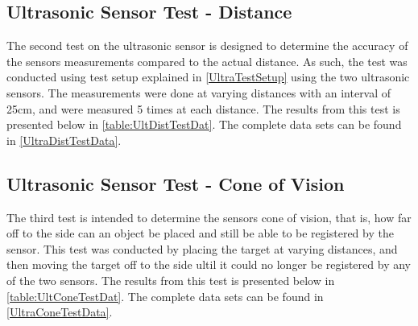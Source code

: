 \subsection{Ultrasonic Sensor Test - Distance}
The second test on the ultrasonic sensor is designed to determine the accuracy
of the sensors measurements compared to the actual distance. As such, the test
was conducted using test setup explained in \autoref{UltraTestSetup} using the
two ultrasonic sensors. The measurements were done at varying distances with an
interval of 25cm, and were measured 5 times at each distance. The results from
this test is presented below in \autoref{table:UltDistTestDat}. The complete
data sets can be found in \autoref{UltraDistTestData}. 



\subsection{Ultrasonic Sensor Test - Cone of Vision}
The third test is intended to determine the sensors cone of vision, that is, how
far off to the side can an object be placed and still be able to be registered
by the sensor. This test was conducted by placing the target at varying
distances, and then moving the target off to the side ultil it could no longer
be registered by any of the two sensors. The results from
this test is presented below in \autoref{table:UltConeTestDat}. The complete
data sets can be found in \autoref{UltraConeTestData}. 






